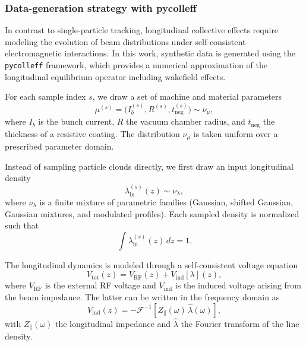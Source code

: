 \documentclass[11pt,a4paper]{article}
\begin{document}
\begin{sloppypar}
\subsubsection{Data-generation strategy with pycolleff}
\label{subsubsec:data-generation-pycolleff}

In contrast to single-particle tracking, longitudinal collective effects require modeling the evolution of beam distributions under self-consistent electromagnetic interactions. In this work, synthetic data is generated using the \texttt{pycolleff} framework, which provides a numerical approximation of the longitudinal equilibrium operator including wakefield effects.



For each sample index $s$, we draw a set of machine and material parameters
\begin{equation}
\mu^{(s)} = \big(I_b^{(s)}, R^{(s)}, t_{\mathrm{neg}}^{(s)}\big) \sim \nu_\mu,
\end{equation}
where $I_b$ is the bunch current, $R$ the vacuum chamber radius, and $t_{\mathrm{neg}}$ the thickness of a resistive coating. The distribution $\nu_\mu$ is taken uniform over a prescribed parameter domain.


Instead of sampling particle clouds directly, we first draw an input longitudinal density
\begin{equation}
\lambda_{\mathrm{in}}^{(s)}(z) \sim \nu_\lambda,
\end{equation}
where $\nu_\lambda$ is a finite mixture of parametric families (Gaussian, shifted Gaussian, Gaussian mixtures, and modulated profiles). Each sampled density is normalized such that
\begin{equation}
\int \lambda_{\mathrm{in}}^{(s)}(z)\,dz = 1.
\end{equation}


The longitudinal dynamics is modeled through a self-consistent voltage equation
\begin{equation}
V_{\mathrm{tot}}(z) = V_{\mathrm{RF}}(z) + V_{\mathrm{ind}}[\lambda](z),
\end{equation}
where $V_{\mathrm{RF}}$ is the external RF voltage and $V_{\mathrm{ind}}$ is the induced voltage arising from the beam impedance. The latter can be written in the frequency domain as
\begin{equation}
V_{\mathrm{ind}}(z) = - \mathcal{F}^{-1} \left[ Z_{\parallel}(\omega)\,\hat{\lambda}(\omega) \right],
\end{equation}
with $Z_{\parallel}(\omega)$ the longitudinal impedance and $\hat{\lambda}$ the Fourier transform of the line density.


\end{sloppypar}
\end{document}
